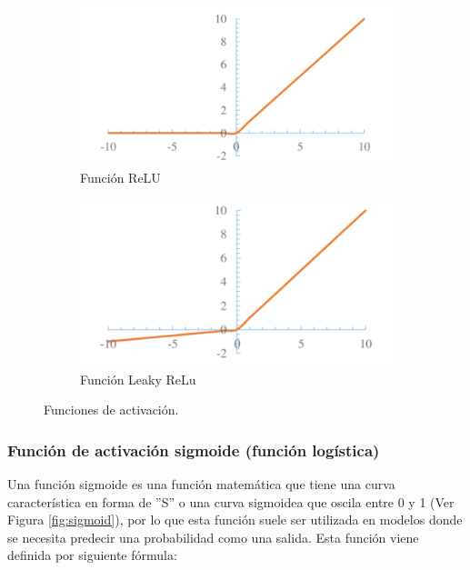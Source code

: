 \begin{figure}
        \begin{subfigure}[h]{0.45\textwidth} 
            \includegraphics[width=\textwidth]{imagenes/Cap4/relu}
            \caption{Funci\'{o}n ReLU}
            \label{fig:relu}
        \end{subfigure}       
        \begin{subfigure}[h]{0.45\textwidth} 
            \includegraphics[width=\textwidth]{imagenes/Cap4/l_relu}
            \caption{Funci\'{o}n Leaky ReLu}
            \label{fig:l_relu}
        \end{subfigure}
        \caption{Funciones de activaci\'{o}n.}
        
		\label{fig:nor_nor}
    \end{figure}
    
\subsubsection{Funci\'{o}n de activaci\'{o}n sigmoide (funci\'{o}n log\'{i}stica)}

Una funci\'{o}n sigmoide es una funci\'{o}n matem\'{a}tica que tiene una curva caracter\'{i}stica en forma de ''S'' o una curva sigmoidea que oscila entre 0 y 1 (Ver Figura \ref{fig:sigmoid}), por lo que esta funci\'{o}n suele ser utilizada en modelos donde se necesita predecir una probabilidad como una salida. Esta funci\'{o}n viene definida por siguiente f\'{o}rmula:

